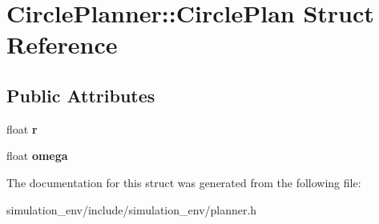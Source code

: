 \hypertarget{structCirclePlanner_1_1CirclePlan}{}\section{Circle\+Planner\+:\+:Circle\+Plan Struct Reference}
\label{structCirclePlanner_1_1CirclePlan}
\subsection*{Public Attributes}
\begin{DoxyCompactItemize}
\item 
float {\bfseries r}\hypertarget{structCirclePlanner_1_1CirclePlan_a713b4aad1fdffcdc82cc2242a87c9203}{}\label{structCirclePlanner_1_1CirclePlan_a713b4aad1fdffcdc82cc2242a87c9203}

\item 
float {\bfseries omega}\hypertarget{structCirclePlanner_1_1CirclePlan_a3bd3fe64ecc478997f8ffe85be6aaa4e}{}\label{structCirclePlanner_1_1CirclePlan_a3bd3fe64ecc478997f8ffe85be6aaa4e}

\end{DoxyCompactItemize}


The documentation for this struct was generated from the following file\+:\begin{DoxyCompactItemize}
\item 
simulation\+\_\+env/include/simulation\+\_\+env/planner.\+h\end{DoxyCompactItemize}
